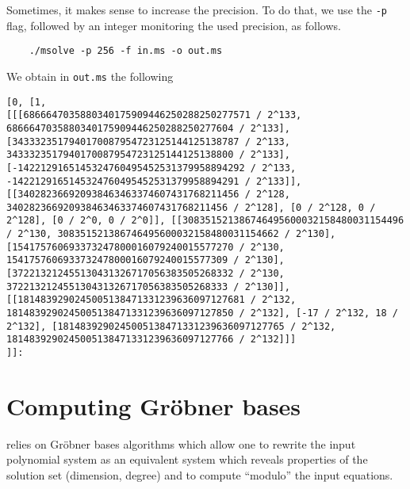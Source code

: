 \documentclass[a4paper,english,11pt]{scrartcl}
\theoremstyle{definition}
\theoremstyle{remark}
\begin{document}
Sometimes, it makes sense to increase the precision. To do that, we use the
\verb+-p+ flag, followed by an integer monitoring the used precision, as
follows.
\begin{tcolorbox}
  \begin{lstlisting}
    ./msolve -p 256 -f in.ms -o out.ms 
  \end{lstlisting}
\end{tcolorbox}
We obtain in \verb+out.ms+ the following
\begin{tcolorbox}
{\tiny\begin{lstlisting}[breaklines]
[0, [1,
[[[6866647035880340175909446250288250277571 / 2^133, 6866647035880340175909446250288250277604 / 2^133], [3433323517940170087954723125144125138787 / 2^133, 3433323517940170087954723125144125138800 / 2^133], [-1422129165145324760495452531379958894292 / 2^133, -1422129165145324760495452531379958894291 / 2^133]], [[340282366920938463463374607431768211456 / 2^128, 340282366920938463463374607431768211456 / 2^128], [0 / 2^128, 0 / 2^128], [0 / 2^0, 0 / 2^0]], [[308351521386746495600032158480031154496 / 2^130, 308351521386746495600032158480031154662 / 2^130], [154175760693373247800016079240015577270 / 2^130, 154175760693373247800016079240015577309 / 2^130], [372213212455130431326717056383505268332 / 2^130, 372213212455130431326717056383505268333 / 2^130]], [[1814839290245005138471331239636097127681 / 2^132, 1814839290245005138471331239636097127850 / 2^132], [-17 / 2^132, 18 / 2^132], [1814839290245005138471331239636097127765 / 2^132, 1814839290245005138471331239636097127766 / 2^132]]]
]]:
\end{lstlisting}}
\end{tcolorbox}


\section{Computing Gr\"obner bases}\label{sec:grobner}

\msolve relies on Gr\"obner bases algorithms which allow one to rewrite the
input polynomial system as an equivalent system which reveals properties of the
solution set (dimension, degree) and to compute ``modulo'' the input equations.
\end{document}
